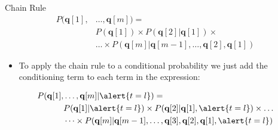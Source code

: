 \documentclass[xcolor={table}]{beamer}
\begin{document}
\begin{frame}
	\begin{block}{Chain Rule}
\begin{equation*}
\begin{alignedat}{2}
P(\mathbf{q}[1],& \dots, \mathbf{q}[m])= \\
&P(\mathbf{q}[1]) \times P(\mathbf{q}[2] | \mathbf{q}[1]) \times\\
& \dots \times P(\mathbf{q}[m] |\mathbf{q}[m-1], \dots, \mathbf{q}[2],\mathbf{q}[1])
\end{alignedat}
\end{equation*}
	\end{block}
	\begin{itemize}
	\item To apply the chain rule to a conditional probability we just add the conditioning term to each term in the expression: 
	\end{itemize}
\begin{equation*}
\begin{alignedat}{2}
P(\mathbf{q}[1],&\dots,\mathbf{q}[m] |\alert{t=l})= \\
&P(\mathbf{q}[1]|\alert{t=l}) \times P(\mathbf{q}[2] | \mathbf{q}[1], \alert{t=l}) \times \dots\\
& \dots\times P(\mathbf{q}[m] |\mathbf{q}[m-1], \dots, \mathbf{q}[3], \mathbf{q}[2],\mathbf{q}[1], \alert{t=l})
\end{alignedat}
\end{equation*}
\end{frame}
\end{document}
